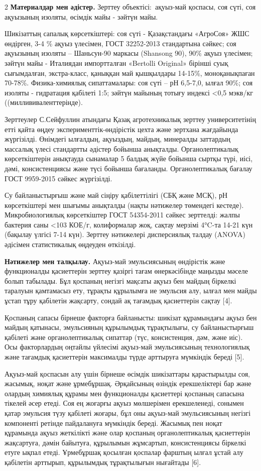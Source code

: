 \begin{multicols}{2}
{\bfseries Материалдар мен әдістер.} Зерттеу объектісі:~ақуыз-май қоспасы,
соя сүті, соя ақуызының изоляты, өсімдік майы - зәйтүн майы.

Шикізаттың сапалық көрсеткіштері: соя сүті - Қазақстандағы «АгроСоя» ЖШС
өндірген, 3-4 \% ақуыз үлесімен, ГОСТ 32252-2013 стандартына сәйкес; соя
ақуызының изоляты -- Шаньсун-90 маркасы (Shansong 90), 90\% ақуыз
үлесімен; зәйтүн майы - Италиядан импортталған «Bertolli Original»
бірінші суық сығымдалған, экстра-класс, қаныққан май қышқылдары 14-15\%,
моноқанықпаған 70-78\%. Физика-химиялық сипаттамалары: соя сүті -- рН
6,5-7,0, ылғал 90\%; соя изоляты - гидратация қабілеті 1:5; зәйтүн
майының тотығу индексі <0,5 мэкв/кг ((миллививаленттерінде).

Зерттеулер С.Сейфуллин атындағы Қазақ агротехникалық зерттеу
университетінің етті қайта өңдеу эксперименттік-өндірістік цехта және
зертхана жағдайында жүргізілді. Өнімдегі ылғалдың, ақуыздың, майдың,
минералды заттардың массалық үлесі стандартты әдістер бойынша анықталды.
Органолептикалық көрсеткіштерін анықтауда сынамалар 5 балдық жүйе
бойынша сыртқы түрі, иісі, дәмі, консистенциясы және түсі бойынша
бағаланды. Органолептикалық бағалау ГОСТ 9959-2015 сәйкес жүргізілді.

Су байланыстырғыш және май сіңіру қабілеттілігі (СБҚ және МСҚ), рН
көрсеткіштері мен шығымы анықталды (нақты нәтижелер төмендегі кестеде).
Микробиологиялық көрсеткіштер ГОСТ 54354-2011 сәйкес зерттелді: жалпы
бактерия саны <103 КОЕ/г, колиформалар жоқ, сақтау мерзімі
4°C-та 14-21 күн (бақылау үлгісі 7-14 күн). Зерттеу нәтижелері
дисперсиялық талдау (ANOVA) әдісімен статистикалық өңдеуден өткізілді.

{\bfseries Нәтижелер мен талқылау.} Ақуыз-май эмульсиясының өндірістік және
функционалды қасиеттерін зерттеу қазіргі тағам өнеркәсібінде маңызды
мәселе болып табылады. Бұл қоспаның негізгі мақсаты ақуыз бен майдың
біркелкі таралуын қамтамасыз ету, тұрақты құрылымға ие эмульсия алу,
ылғал мен майды ұстап тұру қабілетін жақсарту, сондай ақ тағамдық
қасиеттерін сақтау {[}4{]}.

Қоспаның сапасы бірнеше факторға байланысты: шикізат құрамындағы ақуыз
бен майдың қатынасы, эмульсияның құрылымдық тұрақтылығы, су
байланыстырғыш қабілеті және органолептикалық сипаттар (түс,
консистенция, дәм, және иіс). Осы факторлардың оңтайлы үйлесімі
ақуыз-май эмульсиясының технологиялық және тағамдық қасиеттерін
максималды түрде арттыруға мүмкіндік береді {[}5{]}.

Ақуыз-май қоспасын алу үшін бірнеше өсімдік шикізаттары қарастырылды
соя, жасымық, ноқат және ұрмебұршақ. Әрқайсының өзіндік ерекшеліктері
бар және олардың химиялық құрамы мен функционалды қасиеттері қоспаның
сапасына тікелей әсер етеді. Соя ең жоғарғы ақуыз мөлшерімен
ерекшеленеді, сонымен қатар эмульсия түзу қабілеті жоғары, бұл оны
ақуыз-май эмульсиясының негізгі компоненті ретінде пайдалануға мүмкіндік
береді. Жасымық пен ноқат құрамында ақуыз жеткілікті және олар қоспаның
органолептикалық қасиеттерін жақсартуға, дәмін байытуға, құрылымын
жұмсартып, консистенциясы біркелкі етуге ықпал етеді. Ұрмебұршақ
қосылған қоспалар фарштың ылғал ұстай алу қабілетін арттырып, құрылымдық
тұрақтылығын нығайтады {[}6{]}.


\end{multicols}
